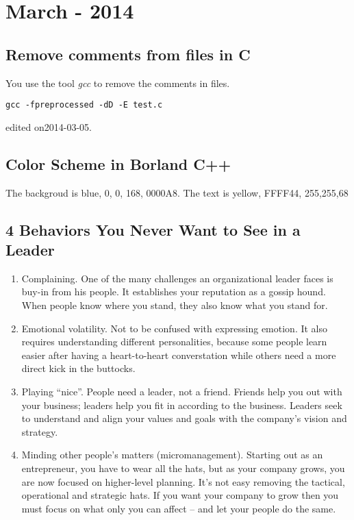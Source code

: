 
\chapter[March - 2014]{March - 2014} %

\label{ch:mar:2014} %

\section{Remove comments from files in C}
You use the tool {\it gcc} to remove the comments in files.
\begin{verbatim}
gcc -fpreprocessed -dD -E test.c
\end{verbatim}

\hfill {\tiny edited on2014-03-05.}

\section{Color Scheme in Borland C++}
The backgroud is blue, 0, 0, 168, 0000A8.
The text is yellow, FFFF44, 255,255,68

\section{ 4 Behaviors You Never Want to See in a Leader}
\begin{enumerate}
    \item Complaining. One of the many challenges an organizational leader faces is buy-in from his people. 
        It establishes your reputation as a gossip hound.
        When people know where you stand, they also know what you stand for.
    \item Emotional volatility. Not to be confused with expressing emotion. It also requires understanding different personalities, because some people learn easier after having a heart-to-heart converstation while others need a more direct kick in the buttocks.
    \item Playing ``nice''.  People need a leader, not a friend. Friends help you out with your business; leaders help you fit in according to the business. Leaders seek to understand and align your values and goals with the company's vision and strategy.
    \item Minding other people's matters (micromanagement). Starting out as an entrepreneur, you have to wear all the hats, but as your company grows, you are now focused on higher-level planning. It's not easy removing the tactical, operational and strategic hats. If you want your company to grow then you must focus on what only you can affect -- and let your people do the same.
\end{enumerate}

